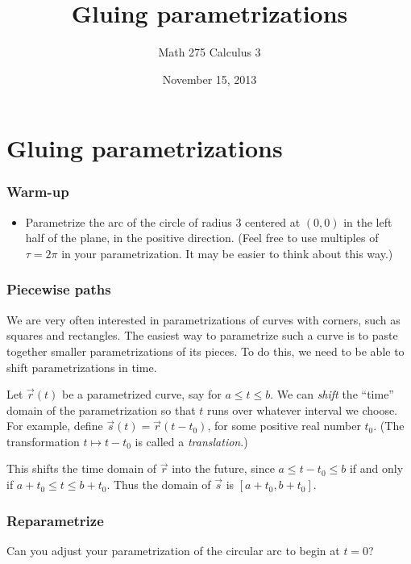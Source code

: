 \documentclass[11pt,ignorenonframetext,aspectratio=169,xcolor={svgnames}]{beamer}
\title{Gluing parametrizations}
\author{Math 275 Calculus 3}
\date{November 15, 2013}
\begin{document}
\frame{\titlepage}

\section{Gluing parametrizations}

\begin{frame}\frametitle{Warm-up}

\begin{itemize}[<+->]
\itemsep1pt\parskip0pt
\item
  Parametrize the arc of the circle of radius $3$ centered at $(0,0)$ in
  the left half of the plane, in the positive direction. (Feel free to
  use multiples of $\tau = 2\pi$ in your parametrization. It may be
  easier to think about this way.)
\end{itemize}

\end{frame}

\begin{frame}\frametitle{Piecewise paths}

We are very often interested in parametrizations of curves with corners,
such as squares and rectangles. The easiest way to parametrize such a
curve is to paste together smaller parametrizations of its pieces. To do
this, we need to be able to shift parametrizations in time.

Let $\vec{r}(t)$ be a parametrized curve, say for $a \leq t \leq b$. We
can \emph{shift} the ``time'' domain of the parametrization so that $t$
runs over whatever interval we choose. For example, define
$\vec{s}(t) = \vec{r}(t - t_0)$, for some positive real number $t_0$.
(The transformation $t \mapsto t - t_0$ is called a \emph{translation}.)

This shifts the time domain of $\vec{r}$ into the future, since
$a \leq t - t_0 \leq b$ if and only if $a + t_0 \leq t \leq b + t_0$.
Thus the domain of $\vec{s}$ is $[a + t_0, b+t_0]$.

\end{frame}

\begin{frame}\frametitle{Reparametrize}

Can you adjust your parametrization of the circular arc to begin at
$t = 0$?

\end{frame}
\end{document}
